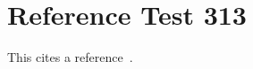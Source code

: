 \documentclass{article}
\begin{document}
\section{Reference Test 313}
This cites a reference~\cite{test313}.

\end{document}
